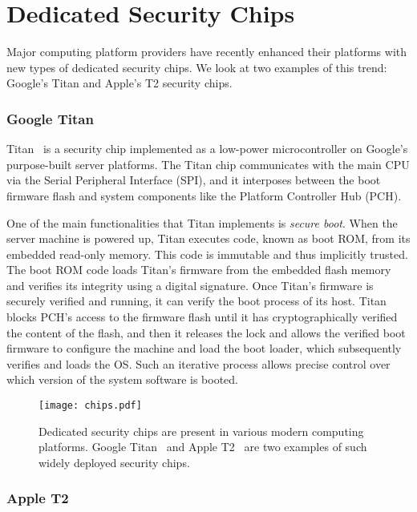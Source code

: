\section*{Dedicated Security Chips}

Major computing platform providers have recently enhanced their platforms with new types of dedicated security chips. We look at two examples of this trend: Google's Titan and Apple's T2 security chips.

\subsubsection*{Google Titan}

Titan~\cite{titan} is a security chip implemented as a low-power microcontroller on Google's purpose-built server platforms. The Titan chip communicates with the main CPU via the Serial Peripheral Interface (SPI), and it interposes between the boot firmware flash and system components like the Platform Controller Hub (PCH).

 One of the main functionalities that Titan implements is \emph{secure boot}. When the server machine is powered up, Titan executes code, known as boot ROM, from its embedded read-only memory. This code is immutable and thus implicitly trusted. The boot ROM code loads Titan's firmware from the embedded flash memory and verifies its integrity using a digital signature. Once Titan's firmware is securely verified and running, it can verify the boot process of its host. Titan blocks PCH's access to the firmware flash until it has cryptographically verified the content of the flash, and then it releases the lock and allows the verified boot firmware to configure the machine and load the boot loader, which subsequently verifies and loads the OS. Such an iterative process allows precise control over which version of the system software is booted. 

\begin{figure}[t]
    \centering
    \texttt{[image: chips.pdf]}
    \caption{Dedicated security chips are present in various modern computing platforms. Google Titan~\cite{titan} and Apple T2~\cite{t2} are two examples  of such widely deployed security chips.}
\label{fig:prototype}   
\end{figure}

 
\subsubsection*{Apple T2}
 
